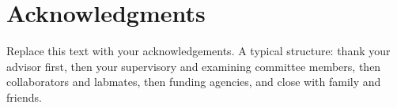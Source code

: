 

\chapter{Acknowledgments}

Replace this text with your acknowledgements.  A typical structure:
thank your advisor first, then your supervisory and examining
committee members, then collaborators and labmates, then funding
agencies, and close with family and friends.
